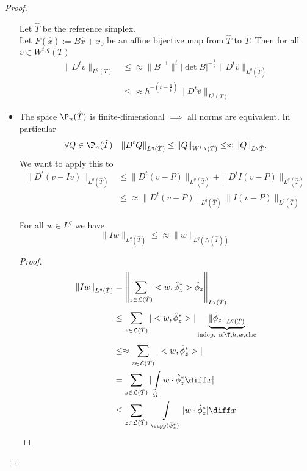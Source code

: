 \begin{proof}
\begin{itemize}
\begin{equation*}
			\end{equation*}
			Let $\hat{T}$ be the reference simplex.\\
			Let $F(\hat{x}):= B\hat{x} + x_{0}$ be an affine bijective map from $\hat{T}$ to $T$.
			Then for all $v \in W^{t,q}(T)$ 
			\begin{align*}
				\|D^tv\|_{L^{q}(T)} &\leq \approx \|B^{-1} \|^{t} |\det B|^{-\frac{1}{q}} \|D^t \hat{v}\|_{L^{q}(\hat{T})}\\
									&\leq \approx h^{-(t-\frac{d}{p})} \|D^t \hat{v}\|_{L^{q}(T)}
			\end{align*}
		\item The space $\P_{n}(\hat{T})$ is finite-dimensional $\implies$ all norms are equivalent. In particular 
			\begin{equation*}
				\forall Q \in \P_{n}(\hat{T}) \quad \|D^t Q\|_{L^{q}(\hat{T})} \leq \|Q\|_{W^{t,q}(\hat{T})} \leq\approx \|Q\|_{L^{q}\hat{T}}. 
			\end{equation*}
			We want to apply this to 
			\begin{align*}
				\|D^t(v-Iv)\|_{L^{q}(\hat{T})} &\leq \|D^t(v-P)\|_{L^{q}(\hat{T})} + \|D^tI(v-P)\|_{L^{q}(\hat{T})}\\
											   &\leq\approx \|D^t(v-P)\|_{L^{q}(\hat{T})} \|I(v-P)\|_{L^{q}(\hat{T})}
			\end{align*}
		\begin{lemma}
			For all $w\in L^q$ we have 
			\begin{equation*}
				\|Iw\|_{L^{q}(\hat{T})} \leq \approx \|w\|_{L^{q}(N(\hat{T}))}
			\end{equation*}
		\end{lemma}
		\begin{proof}
			\begin{align*}
				\|Iw\|_{L^{q}(\hat{T})} &= \left\|\sum\limits_{z \in\mathcal{L}(\hat{T})}^{} <w,\hat{\phi}_{z}^*>\hat{\phi}_{z}\right\|_{L^{q}(\hat{T})}\\
										&\leq \sum\limits_{z \in\mathcal{L}(\hat{T})}^{} |<w,\hat{\phi}_{z}^*>| \underbrace{\|\hat{\phi}_{z}\|_{L^{q}(\hat{T})}}_{\text{indep. of} \T,h,w,\text{else}}\\
										&\leq\approx \sum\limits_{z \in\mathcal{L}(\hat{T})}^{} |<w,\hat{\phi}_{z}^*>|\\
										&= \sum\limits_{z \in\mathcal{L}(\hat{T})}^{} |\int\limits_{\hat{\Omega}}w\cdot\hat{\phi}_{z}^*\diff x |\\
										&\leq \sum\limits_{z \in\mathcal{L}(\hat{T})}^{} \  \int\limits_{\supp(\hat{\phi}_{z}^*)} |w \cdot \hat{\phi}_{z}^*|\diff x \\

\end{align*}
\end{proof}
\end{itemize}
\end{proof}
